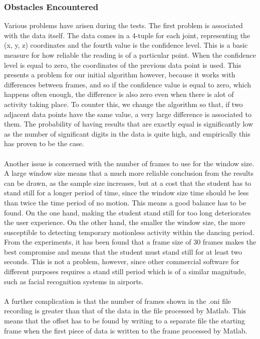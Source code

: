 \documentclass[a4paper]{article}
\begin{document}
\subsubsection{Obstacles Encountered}
\noindent
Various problems have arisen during the tests. The first problem is associated with the data itself. The data comes in a 4-tuple for each joint, representing the (x, y, z) coordinates and the fourth value is the confidence level. This is a basic measure for how reliable the reading is of a particular point. When the confidence level is equal to zero, the coordinates of the previous data point is used. This presents a problem for our initial algorithm however, because it works with differences between frames, and so if the confidence value is equal to zero, which happens often enough, the difference is also zero even when there is alot of activity taking place. To counter this, we change the algorithm so that, if two adjacent data points have the same value, a very large difference is associated to them. The probability of having results that are exactly equal is significantly low as the number of significant digits in the data is quite high, and empirically this has proven to be the case.\\\\
\noindent
Another issue is concerned with the number of frames to use for the window size. A large window size means that a much more reliable conclusion from the results can be drawn, as the sample size increases, but at a cost that the student has to stand still for a longer period of time, since the window size time should be less than twice the time period of no motion. This means a good balance has to be found. On the one hand, making the student stand still for too long deteriorates the user experience. On the other hand, the smaller the window size, the more susceptible to detecting temporary motionless activity within the dancing period. From the experiments, it has been found that a frame size of 30 frames makes the best compromise and means that the student must stand still for at least two seconds. This is not a problem, however, since other commercial software for different purposes requires a stand still period which is of a similar magnitude, such as facial recognition systems in airports. \\\\
\noindent
A further complication is that the number of frames shown in the .oni file recording is greater than that of the data in the file processed by Matlab. This means that the offset has to be found by writing to a separate file the starting frame when the first piece of data is written to the frame processed by Matlab. 
\end{document}
